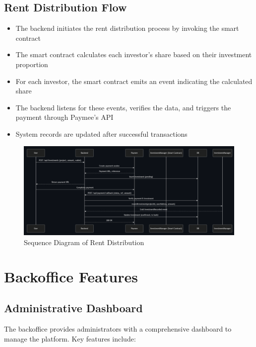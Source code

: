 \subsection{Rent Distribution Flow}

\begin{itemize}
    \item The backend initiates the rent distribution process by invoking the smart contract
    \item The smart contract calculates each investor's share based on their investment proportion
    \item For each investor, the smart contract emits an event indicating the calculated share
    \item The backend listens for these events, verifies the data, and triggers the payment through Paymee's API
    \item System records are updated after successful transactions
\end{itemize}

\begin{figure}[htbp]
  \centering
  \includegraphics[width=\textwidth]{images/rent_distribution_sequence.png}
  \caption{Sequence Diagram of Rent Distribution}
  \label{fig:rent-distribution-sequence}
\end{figure}

\section{Backoffice Features}

\subsection{Administrative Dashboard}

The backoffice provides administrators with a comprehensive dashboard to manage the platform. Key features include:

